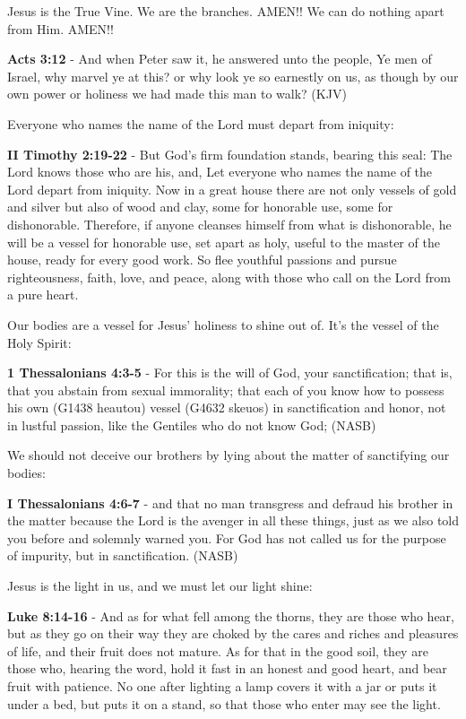 \documentclass[11pt]{article}
\begin{document}
Jesus is the True Vine. We are the branches. AMEN!! We can do nothing apart from Him. AMEN!!

\textbf{Acts 3:12} - And when Peter saw it, he answered unto the people, Ye men of Israel, why marvel ye at this? or why look ye so earnestly on us, as though by our own power or holiness we had made this man to walk? (KJV)

Everyone who names the name of the Lord must depart from iniquity:

\textbf{II Timothy 2:19-22} - But God's firm foundation stands, bearing this seal: The Lord knows those who are his, and, Let everyone who names the name of the Lord depart from iniquity. Now in a great house there are not only vessels of gold and silver but also of wood and clay, some for honorable use, some for dishonorable. Therefore, if anyone cleanses himself from what is dishonorable, he will be a vessel for honorable use, set apart as holy, useful to the master of the house, ready for every good work. So flee youthful passions and pursue righteousness, faith, love, and peace, along with those who call on the Lord from a pure heart.

Our bodies are a vessel for Jesus' holiness to shine out of. It's the vessel of the Holy Spirit:

\textbf{1 Thessalonians 4:3-5} - For this is the will of God, your sanctification; that is, that you abstain from sexual immorality; that each of you know how to possess his own (G1438 heautou) vessel (G4632 skeuos) in sanctification and honor, not in lustful passion, like the Gentiles who do not know God; (NASB)

We should not deceive our brothers by lying about the matter of sanctifying our bodies:

\textbf{I Thessalonians 4:6-7} - and that no man transgress and defraud his brother in the matter because the Lord is the avenger in all these things, just as we also told you before and solemnly warned you.
For God has not called us for the purpose of impurity, but in sanctification. (NASB)

Jesus is the light in us, and we must let our light shine:

\textbf{Luke 8:14-16} - And as for what fell among the thorns, they are those who hear, but as they go on their way they are choked by the cares and riches and pleasures of life, and their fruit does not mature.
As for that in the good soil, they are those who, hearing the word, hold it fast in an honest and good heart, and bear fruit with patience. No one after lighting a lamp covers it with a jar or puts it under a bed, but puts it on a stand, so that those who enter may see the light.
\end{document}
